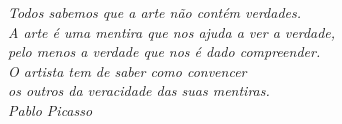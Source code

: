 \begin{epigrafe}
\vspace*{\fill}
	\begin{flushright}
	\textit{Todos sabemos que a arte não contém verdades.\\
	A arte é uma mentira que nos ajuda a ver a verdade,\\
	pelo menos a verdade que nos é dado compreender.\\
	O artista tem de saber como convencer\\
	os outros da veracidade das suas mentiras.\\
	\vspace*{3mm}	
	Pablo Picasso}
	\end{flushright}
\end{epigrafe}
%
%